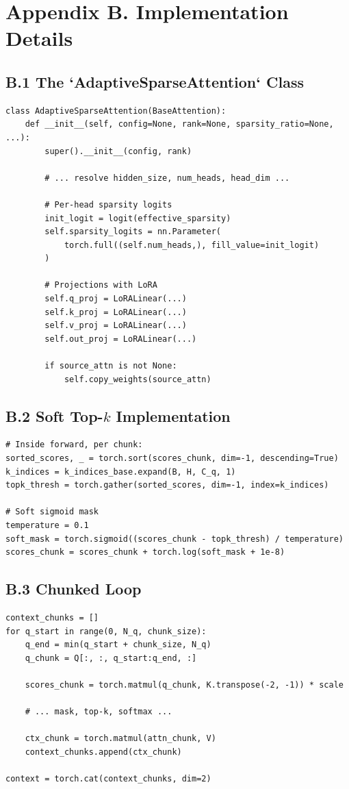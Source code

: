 
\section{Appendix B. Implementation Details}

\subsection{B.1 The `AdaptiveSparseAttention` Class}

\begin{lstlisting}
class AdaptiveSparseAttention(BaseAttention):
    def __init__(self, config=None, rank=None, sparsity_ratio=None, ...):
        super().__init__(config, rank)
        
        # ... resolve hidden_size, num_heads, head_dim ...
        
        # Per-head sparsity logits
        init_logit = logit(effective_sparsity)
        self.sparsity_logits = nn.Parameter(
            torch.full((self.num_heads,), fill_value=init_logit)
        )
        
        # Projections with LoRA
        self.q_proj = LoRALinear(...)
        self.k_proj = LoRALinear(...)
        self.v_proj = LoRALinear(...)
        self.out_proj = LoRALinear(...)
        
        if source_attn is not None:
            self.copy_weights(source_attn)
\end{lstlisting}

\subsection{B.2 Soft Top-$k$ Implementation}

\begin{lstlisting}
# Inside forward, per chunk:
sorted_scores, _ = torch.sort(scores_chunk, dim=-1, descending=True)
k_indices = k_indices_base.expand(B, H, C_q, 1)
topk_thresh = torch.gather(sorted_scores, dim=-1, index=k_indices)

# Soft sigmoid mask
temperature = 0.1
soft_mask = torch.sigmoid((scores_chunk - topk_thresh) / temperature)
scores_chunk = scores_chunk + torch.log(soft_mask + 1e-8)
\end{lstlisting}

\subsection{B.3 Chunked Loop}

\begin{lstlisting}
context_chunks = []
for q_start in range(0, N_q, chunk_size):
    q_end = min(q_start + chunk_size, N_q)
    q_chunk = Q[:, :, q_start:q_end, :]
    
    scores_chunk = torch.matmul(q_chunk, K.transpose(-2, -1)) * scale
    
    # ... mask, top-k, softmax ...
    
    ctx_chunk = torch.matmul(attn_chunk, V)
    context_chunks.append(ctx_chunk)

context = torch.cat(context_chunks, dim=2)
\end{lstlisting}

